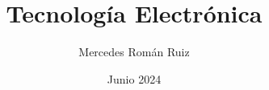 \documentclass[12pt, a4paper, twoside]{book}
\title{Tecnología Electrónica}
\author{Mercedes Román Ruiz}
\date{Junio 2024}
\begin{document}
\sloppy 
\setlength{\parindent}{30pt}
\setlength{\parskip}{6pt}
\renewcommand\thesection{\arabic{section}}
\renewcommand{\baselinestretch}{1.5}
\renewcommand{\listtablename}{Índice de tablas} %
\renewcommand{\tablename}{Tabla} %
\renewcommand{\baselinestretch}{1.5}

\fancyhead{}
\fancyfoot{}
\pagestyle{fancy}
\chead[\rightmark]{\leftmark}
\fancyfoot[LE,RO]{\thepage}


\maketitle





\nocite{*}
\printbibliography
\end{document}
